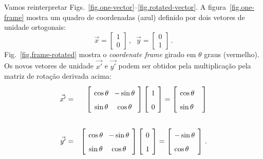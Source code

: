 Vamos reinterpretar Figs.~\ref{fig.one-vector}--\ref{fig.rotated-vector}. A figura~\ref{fig.one-frame} mostra um quadro de coordenadas (azul) definido por dois vetores de unidade ortogonais:
\[
\vec{x}= \left[\begin{array}{c}1\\0\end{array}\right]\,,\;\;
\vec{y}= \left[\begin{array}{c}0\\1\end{array}\right]\,.
\]
Fig.~\ref{fig.frame-rotated} mostra o \emph{coordenate frame} girado em $\theta$ graus (vermelho). Os novos vetores de unidade $\vec{x'}$ e $\vec{y'}$ podem ser obtidos pela multiplicação pela matriz de rotação derivada acima:
\begin{eqnarray*}
\vec{x'}&=&
\left[\spacearray\begin{array}{cc}\cos\theta&-\sin\theta\\\sin\theta&\cos\theta\end{array}\right]
\left[\spacearray\begin{array}{c}1\\0\end{array}\right]=
\left[\spacearray\begin{array}{l}\cos \theta\\\sin\theta\;\;\:\end{array}\right]\\
\,\\
\vec{y'}&=&
\left[\spacearray\begin{array}{cc}\cos\theta&-\sin\theta\\\sin\theta&\cos\theta\end{array}\right]
\left[\spacearray\begin{array}{c}0\\1\end{array}\right]=
\left[\spacearray\begin{array}{l}-\sin \theta\\\cos\theta\end{array}\right]\,.
\end{eqnarray*}
